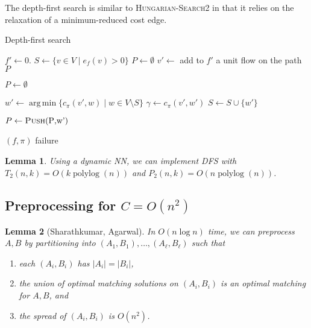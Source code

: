 \documentclass[11pt]{article}
\def\polylog{\mathop{\mathrm{polylog}}}
\DeclareMathOperator*{\argmin}{arg\,min}
\theoremstyle{plain}
\newtheorem{lemma}{Lemma}
\begin{document}
The depth-first search is similar to \textsc{Hungarian-Search2} in that it 
relies on the relaxation of a minimum-reduced cost edge.
\begin{algorithm}
\caption{Depth-first search}
\begin{algorithmic}[1]
	\State $f' \gets 0$.
	\State $S \gets \{v \in V \mid e_f(v) > 0\}$
	\State $P \gets \emptyset$
	\Repeat
		\State $v' \gets$ 
			\State add to $f'$ a unit flow on the path $P$
			
			\State $P \gets \emptyset$
		\EndIf

		\Statex %
		\State $w' \gets \argmin\{c_\pi(v', w) \mid w \in V \setminus S\}$
		\State $\gamma \gets c_\pi(v', w')$
		\Statex %
			\State $S \gets S \cup \{w'\}$
			
			\State $P \gets \Call{Push}{$P$, $w'$}$

		\EndIf




		 
			\State\Return $(f, \pi)$
		\EndIf
	\State\Return failure
\EndFunction
\end{algorithmic}
\end{algorithm}


\begin{lemma}
\label{lemma:goldberg_dfs_time}
	Using a dynamic NN, we can implement \textsc{DFS} with 
	$T_2(n, k) = O(k\polylog(n))$ and $P_2(n, k) = O(n\polylog(n))$.
\end{lemma}








\subsection{Preprocessing for $C = O(n^2)$}

\begin{lemma}[Sharathkumar, Agarwal]
	In $O(n\log n)$ time, we can preprocess $A, B$ by partitioning into
	$(A_1, B_1), \ldots, (A_\ell, B_\ell)$ such that 
	\begin{enumerate}
	\item each $(A_i, B_i)$ has $|A_i| = |B_i|$,
	\item the union of optimal matching solutions on $(A_i, B_i)$
		is an optimal matching for $A, B$, and
	\item the spread of $(A_i, B_i)$ is $O(n^2)$.
	\end{enumerate}
\end{lemma}















{


}
\end{document}
